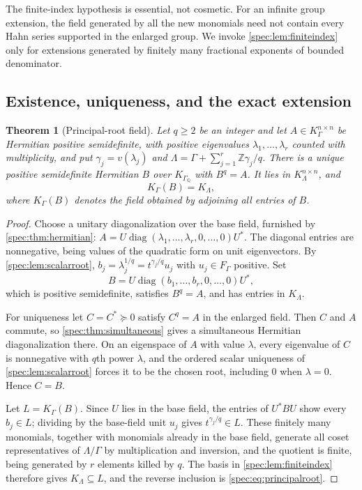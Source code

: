 \documentclass[11pt,a4paper]{article}
\numberwithin{equation}{section}
\newtheorem{theorem}{Theorem}[section]
\theoremstyle{definition}
\theoremstyle{remark}
\newcommand{\Q}{\mathbb Q}
\newcommand{\Z}{\mathbb Z}
\newcommand{\diag}{\operatorname{diag}}
\begin{document}
The finite-index hypothesis is essential, not cosmetic. For an infinite
group extension, the field generated by all the new monomials need not
contain every Hahn series supported in the enlarged group. We invoke
\cref{spec:lem:finiteindex} only for extensions generated by finitely many
fractional exponents of bounded denominator.

\subsection{Existence, uniqueness, and the exact extension}

\begin{theorem}[Principal-root field]\label{spec:thm:rootfield}
Let $q\ge2$ be an integer and let $A\in K_\Gamma^{n\times n}$ be Hermitian positive semidefinite, with
positive eigenvalues $\lambda_1,\ldots,\lambda_r$ counted with multiplicity,
and put $\gamma_j=v(\lambda_j)$ and
$\Lambda=\Gamma+\sum_{j=1}^r\Z\gamma_j/q$. There is a unique positive
semidefinite Hermitian $B$ over $K_{\Gamma_\Q}$ with $B^q=A$. It lies in
$K_\Lambda^{n\times n}$, and
\begin{equation}\label{spec:eq:exactrootfield}
 K_\Gamma(B)=K_\Lambda,
\end{equation}
where $K_\Gamma(B)$ denotes the field obtained by adjoining all entries
of $B$.
\end{theorem}
\begin{proof}
Choose a unitary diagonalization over the base field, furnished by
\cref{spec:thm:hermitian}:
$A=U\diag(\lambda_1,\ldots,\lambda_r,0,\ldots,0)U^*$. The diagonal entries
are nonnegative, being values of the quadratic form on unit eigenvectors. By
\cref{spec:lem:scalarroot}, $b_j=\lambda_j^{1/q}=t^{\gamma_j/q}u_j$ with
$u_j\in F_\Gamma$ positive. Set
\begin{equation}\label{spec:eq:principalroot}
 B=U\diag(b_1,\ldots,b_r,0,\ldots,0)U^*,
\end{equation}
which is positive semidefinite, satisfies $B^q=A$, and has entries in
$K_\Lambda$.

For uniqueness let $C=C^*\succeq0$ satisfy $C^q=A$ in the enlarged field.
Then $C$ and $A$ commute, so \cref{spec:thm:simultaneous} gives a
simultaneous Hermitian diagonalization there. On an eigenspace of $A$ with
value $\lambda$, every eigenvalue of $C$ is nonnegative with $q$th power
$\lambda$, and the ordered scalar uniqueness of
\cref{spec:lem:scalarroot} forces it to be the chosen root, including $0$
when $\lambda=0$. Hence $C=B$.

Let $L=K_\Gamma(B)$. Since $U$ lies in the base field, the entries of
$U^*BU$ show every $b_j\in L$; dividing by the base-field unit $u_j$ gives
$t^{\gamma_j/q}\in L$. These finitely many monomials, together with
monomials already in the base field, generate all coset representatives of
$\Lambda/\Gamma$ by multiplication and inversion, and the quotient is
finite, being generated by $r$ elements killed by $q$. The basis in
\cref{spec:lem:finiteindex} therefore gives $K_\Lambda\subseteq L$, and the
reverse inclusion is \eqref{spec:eq:principalroot}.
\end{proof}
\end{document}
